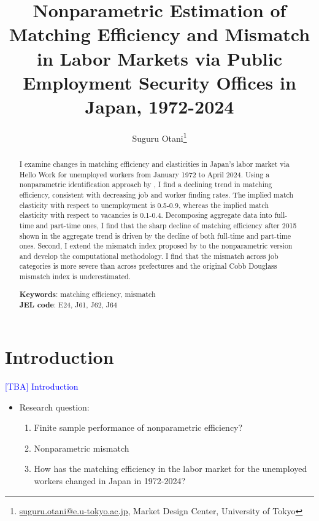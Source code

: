 \documentclass[12pt]{article}
\begin{document}
\title{Nonparametric Estimation of Matching Efficiency and Mismatch in Labor Markets via Public Employment Security Offices in Japan, 1972-2024}
\author{Suguru Otani\thanks{\href{mailto:}{suguru.otani@e.u-tokyo.ac.jp}, Market Design Center, University of Tokyo}}
\maketitle

\begin{abstract}
\noindent

I examine changes in matching efficiency and elasticities in Japan's labor market via Hello Work for unemployed workers from January 1972 to April 2024. 
Using a nonparametric identification approach by \cite{lange2020beyond}, I find a declining trend in matching efficiency, consistent with decreasing job and worker finding rates. 
The implied match elasticity with respect to unemployment is 0.5-0.9, whereas the implied match elasticity with respect to vacancies is 0.1-0.4.
Decomposing aggregate data into full-time and part-time ones, I find that the sharp decline of matching efficiency after 2015 shown in the aggregate trend is driven by the decline of both full-time and part-time ones.
Second, I extend the mismatch index proposed by \cite{csahin2014mismatch} to the nonparametric version and develop the computational methodology. 
I find that the mismatch across job categories is more severe than across prefectures and the original Cobb Douglass mismatch index is underestimated.


\textbf{Keywords}: matching efficiency, mismatch \\
\textbf{JEL code}: E24, J61, J62, J64
\end{abstract}

\section{Introduction}

\textcolor{blue}{[TBA] Introduction}

\begin{itemize}
    \item Research question: 
    \begin{enumerate}
        \item Finite sample performance of nonparametric efficiency?
        \item Nonparametric mismatch
        \item How has the matching efficiency in the labor market for the unemployed workers changed in Japan in 1972-2024?
    \end{enumerate}
\end{itemize}
\end{document}
